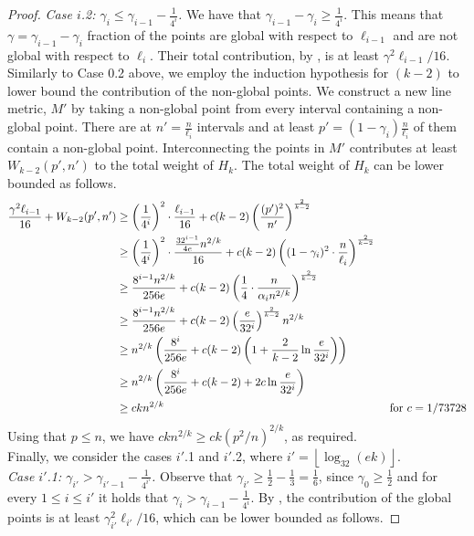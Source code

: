 \documentclass[11pt,english]{article}
\newcommand{\floor}[1]{\ensuremath{\left\lfloor#1\right\rfloor}}
\begin{document}
\begin{proof}
\noindent\textit{Case $i$.2: $\gamma_i \le \gamma_{i-1}-\frac{1}{4^{i}}$.} We have that $\gamma_{i-1}-\gamma_i \ge \frac{1}{4^{i}}$. This means that $\gamma =\gamma_{i-1}-\gamma_i$ fraction of the points are global with respect to $\ell_{i-1}$ and are not global with respect to $\ell_i$. Their total contribution, by , is at least $\gamma^2\ell_{i-1}/16$. Similarly to Case $0$.2 above, we employ the induction hypothesis for $(k-2)$ to lower bound the contribution of the non-global points. We construct a new line metric, $M'$ by taking a non-global point from every interval containing a non-global point. There are at $n'= \frac{n}{\ell_i}$ intervals and at least $p'=(1-\gamma_i)\frac{n}{\ell_i}$ of them contain a non-global point. Interconnecting the points in $M'$ contributes at least $W_{k-2}(p',n')$ to the total weight of $H_k$. The total weight of $H_k$ can be lower bounded as follows.
\begin{align*}
\allowdisplaybreaks
\frac{\gamma^2\ell_{i-1}}{16}+W_{k-2}(p',n') &\ge 
\left(\frac{1}{4^i}\right)^2\cdot \frac{\ell_{i-1}}{16}+c(k-2)\left(\frac{(p')^2}{n'}\right)^{\frac{2}{k-2}}\\
&\ge \left(\frac{1}{4^i}\right)^2\cdot \frac{\frac{32^{i-1}}{4e}n^{2/k}}{16}+c(k-2)\left((1-\gamma_i)^2\cdot \frac{n}{\ell_i}\right)^{\frac{2}{k-2}}\\
&\ge \frac{8^{i-1}n^{2/k}}{256e}+c(k-2)\left(\frac{1}{4}\cdot \frac{n}{\alpha_i n^{2/k}} \right)^{\frac{2}{k-2}}\\
&\ge \frac{8^{i-1}n^{2/k}}{256e}+c(k-2)\left( \frac{e}{32^i}\right)^{\frac{2}{k-2}}n^{2/k}\\
&\ge n^{2/k}\left(\frac{8^i}{256e} + c(k-2)\left(1+\frac{2}{k-2}\ln{\frac{e}{32^i}}\right) \right)\\
&\ge n^{2/k}\left(\frac{8^i}{256e} +c(k-2) + 2c \ln{\frac{e}{32^i}}\right)\\
&\ge ckn^{2/k} &\text{ for } c = 1/73728\\
\end{align*}
Using that $p \le n$, we have $ckn^{2/k} \ge ck\left(p^2/n\right)^{2/k}$, as required.\\

Finally, we consider the cases $i'$.1 and $i'$.2, where $i'=\floor{\log_{32}(ek)}$.\\

\noindent\textit{Case $i'$.1: $\gamma_{i'} > \gamma_{i'-1}-\frac{1}{4^{i'}}$.}
Observe that $\gamma_{i'}\ge \frac{1}{2} - \frac{1}{3}=\frac{1}{6}$, since $\gamma_0 \ge \frac{1}{2}$ and for every $1 \le i \le i'$ it holds that $\gamma_i > \gamma_{i-1}-\frac{1}{4^{i}}$. By , the contribution of the global points is at least $\gamma_{i'}^2\ell_{i'}/16$, which can be lower bounded as follows.


\end{proof}
\end{document}
